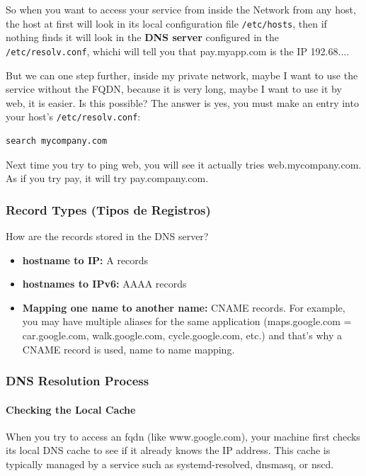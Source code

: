 \documentclass{article}
\newenvironment{codetemplate}[1][]{%
  \mybasecolorbox[#1]
  \itshape
}{%
  \endmybasecolorbox
}
\begin{document}
So when you want to access your service from inside the Network from any host, the host at first will look in its local configuration file \verb|/etc/hosts|, then if nothing finds it will look in the \textbf{DNS server} configured in the \verb|/etc/resolv.conf|, whichi will tell you that pay.myapp.com is the IP 192.68....

But we can one step further, inside my private network, maybe I want to use the service without the FQDN, because it is very long, maybe I want to use it by web, it is easier. Is this possible? The answer is yes, you must make an entry into your host's \verb|/etc/resolv.conf|:

\begin{codetemplate}{}
\begin{verbatim}
search mycompany.com
\end{verbatim}
\end{codetemplate}

Next time you try to ping web, you will see it actually tries web.mycompany.com. As if you try pay, it will try pay.company.com.

\subsubsection{Record Types (Tipos de Registros)}

How are the records stored in the DNS server?

\begin{itemize}
    \item \textbf{hostname to IP:} A records
    \item \textbf{hostnames to IPv6:} AAAA records
    \item \textbf{Mapping one name to another name:} CNAME records. For example, you may have multiple aliases for the same application (maps.google.com = car.google.com, walk.google.com, cycle.google.com, etc.) and that's why a CNAME record is used, name to name mapping.
\end{itemize}

\subsubsection{DNS Resolution Process}

\paragraph{Checking the Local Cache}
When you try to access an fqdn (like www.google.com), your machine first checks its local DNS cache to see if it already knows the IP address. This cache is typically managed by a service such as systemd-resolved, dnsmasq, or nscd.
\end{document}
